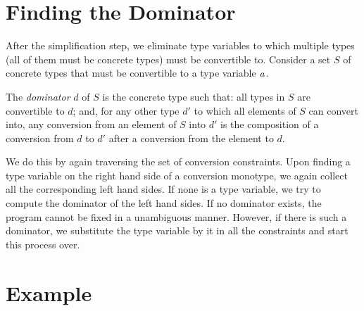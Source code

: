 \section{Finding the Dominator}
After the simplification step, we eliminate type variables to which multiple types (all of them must be concrete types) must be convertible to. Consider a set $S$ of concrete types that must be convertible to a type variable $\mathit{a}$.

The {\it dominator} $d$ of $S$ is the concrete type such that: all types in $S$ are convertible to $d$; and, for any other type $d'$ to which all elements of $S$ can convert into, any conversion from an element of $S$ into $d'$ is the composition of a conversion from $d$ to $d'$ after a conversion from the element to $d$.

We do this by again traversing the set of conversion constraints. Upon finding a type variable on the right hand side of a conversion monotype, we again collect all the corresponding left hand sides. If none is a type variable, we try to compute the dominator of the left hand sides. If no dominator exists, the program cannot be fixed in a unambiguous manner. However, if there is such a dominator, we substitute the type variable by it in all the constraints and start this process over.
\section{Example}
